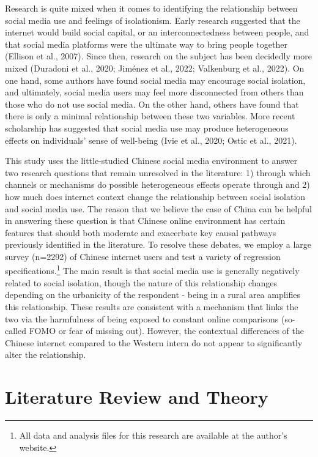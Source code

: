 \documentclass[]{interact}
\theoremstyle{plain}%
\theoremstyle{definition}
\theoremstyle{remark}
\begin{document}
Research is quite mixed when it comes to identifying the relationship
between social media use and feelings of isolationism. Early research
suggested that the internet would build social capital, or an
interconnectedness between people, and that social media platforms were
the ultimate way to bring people together (Ellison et al., 2007). Since
then, research on the subject has been decidedly more mixed (Duradoni et
al., 2020; Jiménez et al., 2022; Valkenburg et al., 2022). On one hand,
some authors have found social media may encourage social isolation, and
ultimately, social media users may feel more disconnected from others
than those who do not use social media. On the other hand, others have
found that there is only a minimal relationship between these two
variables. More recent scholarship has suggested that social media use
may produce heterogeneous effects on individuals' sense of well-being
(Ivie et al., 2020; Ostic et al., 2021).

This study uses the little-studied Chinese social media environment to
answer two research questions that remain unresolved in the literature:
1) through which channels or mechanisms do possible heterogeneous
effects operate through and 2) how much does internet context change the
relationship between social isolation and social media use. The reason
that we believe the case of China can be helpful in answering these
question is that Chinese online environment has certain features that
should both moderate and exacerbate key causal pathways previously
identified in the literature. To resolve these debates, we employ a
large survey (n=2292) of Chinese internet users and test a variety of
regression specifications.\footnote{All data and analysis files for this
  research are available at the author's website.} The main result is
that social media use is generally negatively related to social
isolation, though the nature of this relationship changes depending on
the urbanicity of the respondent - being in a rural area amplifies this
relationship. These results are consistent with a mechanism that links
the two via the harmfulness of being exposed to constant online
comparisons (so-called FOMO or fear of missing out). However, the
contextual differences of the Chinese internet compared to the Western
intern do not appear to significantly alter the relationship.

\hypertarget{literature-review-and-theory}{%
\section{Literature Review and
Theory}\label{literature-review-and-theory}}
\end{document}
